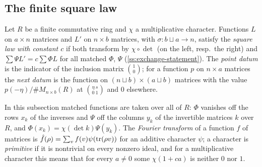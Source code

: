 \subsection{The finite square law}\label{ss:square-law}
Let $R$ be a finite commutative ring and $\chi$ a multiplicative character. Functions $L$ on $a\times n$ matrices and $L'$ on $n\times b$ matrices, with $\sigma\colon b\sqcup a\to n$, satisfy the
\emph{square law with constant $c$} if both transform by $\chi\circ\det$ (on the left, resp.\ the right) and $\sum\Psi L'=c\sum\Phi L$ for all matched $\Phi$, $\Psi$ (\cref{ss:exchange-statement}). The \emph{point
datum} is the indicator of the inclusion matrix $\binom10$; for a function $p$ on $n\times a$ matrices the \emph{next datum} is the function on $(n\sqcup b)\times(a\sqcup b)$ matrices with the value
$p(-\eta)/\#M_{n\times b}(R)$ at $\binom{\eta\ s}{0\ 1}$ and $0$ elsewhere.

In this subsection matched functions are taken over all of $R$: $\Phi$ vanishes off the rows $x_k$ of the inverses and $\Psi$ off the columns $y_k$ of the invertible matrices $k$ over $R$, and
$\Phi(x_k)=\chi(\det k)\Psi(y_k)$. The \emph{Fourier transform} of a function $f$ of matrices is $\hat f(\rho)=\sum_vf(v)\psi(\operatorname{tr}(\rho v))$ for an additive character $\psi$; a character is \emph{primitive} if it is
nontrivial on every nonzero ideal, and for a multiplicative character this means that for every $a\ne0$ some $\chi(1+ca)$ is neither $0$ nor $1$.

